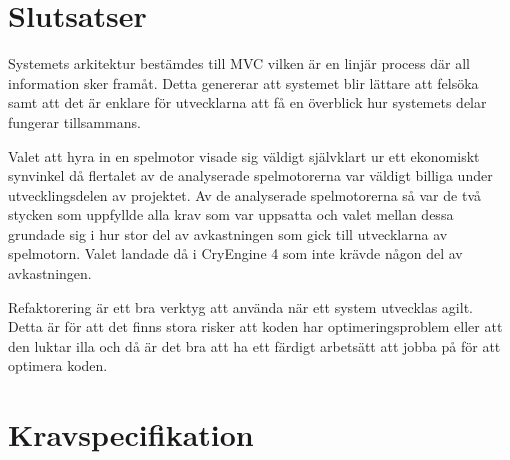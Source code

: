\documentclass[a4paper,12pt,oneside,final]{extbook}
\begin{document}
\chapter{Slutsatser}
 Systemets arkitektur bestämdes till MVC vilken är en linjär process där all information sker framåt. Detta genererar att systemet blir lättare att felsöka samt att det är enklare för utvecklarna att få en överblick hur systemets delar fungerar tillsammans.

Valet att hyra in en spelmotor visade sig väldigt självklart ur ett ekonomiskt synvinkel då flertalet av de analyserade spelmotorerna var väldigt billiga under utvecklingsdelen av projektet. Av de analyserade spelmotorerna så var de två stycken som uppfyllde alla krav som var uppsatta och valet mellan dessa grundade sig i hur stor del av avkastningen som gick till utvecklarna av spelmotorn. Valet landade då i CryEngine 4 som inte krävde någon del av avkastningen.

Refaktorering är ett bra verktyg att använda när ett system utvecklas agilt. Detta är för att det finns stora risker att koden har optimeringsproblem eller att den luktar illa och då är det bra att ha ett färdigt arbetsätt att jobba på för att optimera koden.






\pagestyle{empty}

\appendix


\chapter{Kravspecifikation}\label{Kravspecifikation}

	
\end{document}
